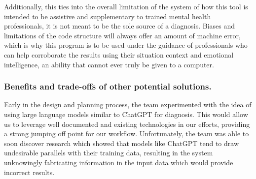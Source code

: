\documentclass[12pt, titlepage]{article}
\begin{document}
Additionally, this ties into the overall limitation of the system of how this tool is intended to be assistive and supplementary to trained mental health professionals, it is not meant to be the sole source of a diagnosis. Biases and limitations of the code structure will always offer an amount of machine error, which is why this program is to be used under the guidance of professionals who can help corroborate the results using their situation context and emotional intelligence, an ability that cannot ever truly be given to a computer.  

\subsubsection{Benefits and trade-offs of other potential solutions.}
Early in the design and planning process, the team experimented with the idea of using large language models similar to ChatGPT for diagnosis. This would allow us to leverage well documented and existing technologies in our efforts, providing a strong jumping off point for our workflow. Unfortunately, the team was able to soon discover research which showed that models like ChatGPT tend to draw undesirable parallels with their training data, resulting in the system unknowingly fabricating information in the input data which would provide incorrect results.
\end{document}
